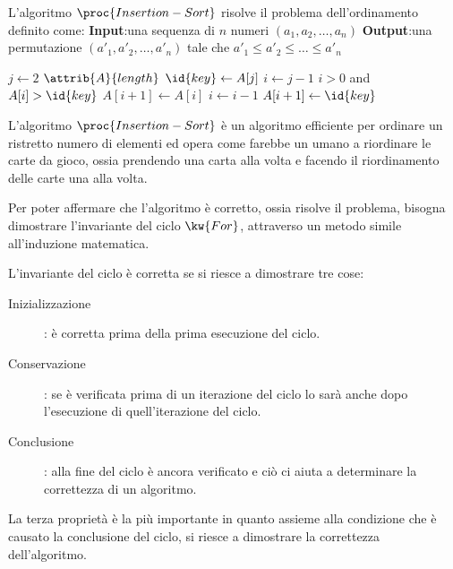 L'algoritmo $\proc{Insertion-Sort}$ risolve il problema dell'ordinamento definito come:\newline
\textbf{Input}:una sequenza di $n$ numeri $(a_1,a_2,\dots,a_n)$ \newline
\textbf{Output}:una permutazione $(a'_1,a'_2,\dots,a'_n)$ tale che $a'_1 \leq a'_2 \leq \dots \leq a'_n$

\begin{codebox}
\li \For $j \gets 2$ \To $\attrib{A}{length}$
    \Do
\li            $\id{key} \gets A[j]$
\li         $i \gets j-1$
\li         \While $i > 0$ and $A[i] > \id{key}$
            \Do
\li                $A[i+1] \gets A[i]$
\li                $i \gets i-1$
            \End
\li         $A[i+1] \gets \id{key}$
    \End
\end{codebox}

L'algoritmo $\proc{Insertion-Sort}$ è un algoritmo efficiente per ordinare un ristretto
numero di elementi ed opera come farebbe un umano a riordinare le carte da gioco,
ossia prendendo una carta alla volta e facendo il riordinamento delle carte una alla volta.

Per poter affermare che l'algoritmo è corretto, ossia risolve il problema, bisogna
dimostrare l'invariante del ciclo $\kw{For}$, attraverso un metodo simile all'induzione matematica.

L'invariante del ciclo è corretta se si riesce a dimostrare tre cose:
\begin{description}
  \item[Inizializzazione]: è corretta prima della prima esecuzione del ciclo.
  \item[Conservazione]: se è verificata prima di un iterazione del ciclo lo sarà
                        anche dopo l'esecuzione di quell'iterazione del ciclo.
  \item[Conclusione]: alla fine del ciclo è ancora verificato e ciò ci aiuta a
                      determinare la correttezza di un algoritmo.
\end{description}
La terza proprietà è la più importante in quanto assieme alla condizione che è causato
la conclusione del ciclo, si riesce a dimostrare la correttezza dell'algoritmo.

